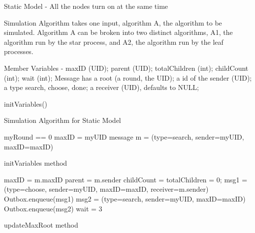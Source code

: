 \documentclass[english]{article}
\begin{document}
Static Model - All the nodes turn on at the same time

Simulation Algorithm takes one input, algorithm A, the algorithm to be simulated. Algorithm A can be broken into two distinct algorithms, A1, the algorithm run by the star process, and A2, the algorithm run by the leaf processes.

Member Variables - maxID (UID); parent (UID); totalChildren (int); childCount (int); wait (int);
Message has a root (a round, the UID); a id of the sender (UID); a type {search, choose, done}; a receiver (UID), defaults to NULL;

\begin{algorithm}
  initVariables() \;

  \caption{Simulation Algorithm for Static Model}
\end{algorithm}

\begin{algorithm}[initVariables]
  myRound == 0 \; 
  maxID = myUID \; 
  message m = (type=search, sender=myUID, maxID=maxID) \;
  \caption{initVariables method}
\end{algorithm}

\begin{algorithm}[updateMaxRoot]
  maxID = m.maxID\; %
  parent = m.sender\; %
  childCount = totalChildren = 0; %
  msg1 = (type=choose, sender=myUID, maxID=maxID, receiver=m.sender) \; %
  Outbox.enqueue(msg1) \;
  msg2 = (type=search, sender=myUID, maxID=maxID) \; %
  Outbox.enqueue(msg2) \;
  wait = 3 \; %
  \caption{updateMaxRoot method}
\end{algorithm}
\end{document}

